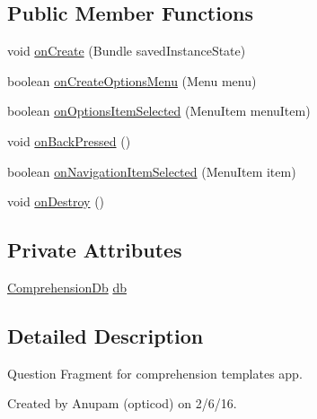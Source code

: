 \subsection*{Public Member Functions}
\begin{DoxyCompactItemize}
\item 
void \hyperlink{classorg_1_1buildmlearn_1_1comprehension_1_1activities_1_1QuestionActivity_ae9c90a61cda63ed5b2c04562964296b4}{on\+Create} (Bundle saved\+Instance\+State)
\item 
boolean \hyperlink{classorg_1_1buildmlearn_1_1comprehension_1_1activities_1_1QuestionActivity_a4abe826779d182b38b7bc1d311e9b9cd}{on\+Create\+Options\+Menu} (Menu menu)
\item 
boolean \hyperlink{classorg_1_1buildmlearn_1_1comprehension_1_1activities_1_1QuestionActivity_ad37331d440ec27300d6dd7df649caaba}{on\+Options\+Item\+Selected} (Menu\+Item menu\+Item)
\item 
void \hyperlink{classorg_1_1buildmlearn_1_1comprehension_1_1activities_1_1QuestionActivity_af9546805aa9c2d45cbb1aeafcc5c8d4e}{on\+Back\+Pressed} ()
\item 
boolean \hyperlink{classorg_1_1buildmlearn_1_1comprehension_1_1activities_1_1QuestionActivity_aca03dd4dcbb57f73374db1f2fbf45e1e}{on\+Navigation\+Item\+Selected} (Menu\+Item item)
\item 
void \hyperlink{classorg_1_1buildmlearn_1_1comprehension_1_1activities_1_1QuestionActivity_a5b7d33dc4778cc0695538c4ea617b422}{on\+Destroy} ()
\end{DoxyCompactItemize}
\subsection*{Private Attributes}
\begin{DoxyCompactItemize}
\item 
\hyperlink{classorg_1_1buildmlearn_1_1comprehension_1_1data_1_1ComprehensionDb}{Comprehension\+Db} \hyperlink{classorg_1_1buildmlearn_1_1comprehension_1_1activities_1_1QuestionActivity_a95d8ebe7963a070ca906f55a01e02574}{db}
\end{DoxyCompactItemize}


\subsection{Detailed Description}
Question Fragment for comprehension template\textquotesingle{}s app. 

Created by Anupam (opticod) on 2/6/16. 

